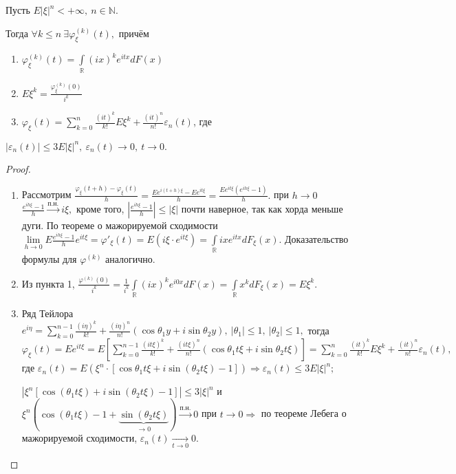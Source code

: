 	\begin{property}
	\begin{theorem}[о производных х.ф.]
		Пусть $E|\xi|^n < + \infty, ~n \in \mathbb{N}.$ 
		
		Тогда $\forall k \leqslant n~ \exists \varphi_\xi^{(k)}(t),$ причём
		\begin{enumerate}
			\item $\varphi_\xi^{(k)}(t) = \int\limits_\mathbb{R}(ix)^ke^{itx}dF(x)$
			\item $E\xi^k = \frac{\varphi_\xi^{(k)}(0)}{i^k}$
			\item $\varphi_\xi(t) = \sum\limits_{k = 0}^{n} \frac{(it)^k}{k!}E\xi^k + \frac{(it)^n}{n!}\varepsilon_n(t)$, где
		\end{enumerate}
		$|\varepsilon_n(t)| \leqslant 3E|\xi|^n, ~\varepsilon_n(t) \to 0, ~ t \to 0.$
	\end{theorem}
	\begin{proof}
		\begin{enumerate}
			\item Рассмотрим $\frac{\varphi_\xi(t + h) - \varphi_\xi(t)}{h} = \frac{Ee^{i(t + h)\xi} - Ee^{it\xi}}{h} = \frac{Ee^{it\xi}(e^{ih\xi} - 1)}{h}.$ при $h \to 0$ $\frac{e^{ih\xi} - 1}{h} \overset{\text{п.н.}}{\longrightarrow}i\xi,$ кроме того, $\left|\frac{e^{ih\xi} - 1}{h}\right| \leqslant |\xi|$ почти наверное, так как хорда меньше дуги. По теореме о мажорируемой сходимости
			$\lim\limits_{h \to 0}E \frac{e^{ih\xi} - 1}{h}e^{it\xi} = \varphi'_\xi(t) = E(i\xi\cdot e^{it\xi}) = \int\limits_\mathbb{R} ixe^{itx}dF_\xi(x).$ Доказательство формулы для $\varphi^{(k)}$ аналогично.
			\item Из пункта 1, $\frac{\varphi^{(k)}(0)}{i^k} = \frac{1}{i^k} \int\limits_\mathbb{R}(ix)^ke^{i0x}dF(x) = \int\limits_\mathbb{R}x^k dF_\xi(x) = E\xi^k.$
			\item Ряд Тейлора $e^{i\eta} = \sum\limits_{k = 0}^{n - 1} \frac{(i\eta)^k}{k!} + \frac{(i\eta)^n}{n!}(\cos\theta_1y + i\sin\theta_2 y), ~|\theta_1| \leqslant 1, ~ |\theta_2| \leqslant 1,$ тогда
			$\varphi_\xi(t) = Ee^{it\xi} = E\left[\sum\limits_{k = 0}^{n - 1} \frac{(it\xi)^k}{k!} + \frac{(it\xi)^n}{n!}(\cos\theta_1 t\xi + i\sin \theta_2 t\xi)\right] = \sum\limits_{k = 0}^{n}\frac{(it)^k}{k!}E\xi^k + \frac{(it)^n}{n!}\varepsilon_n(t), $ где $\varepsilon_n(t) = E(\xi^n\cdot [\cos\theta_1t\xi + i\sin(\theta_2 t\xi) - 1]) \Rightarrow \varepsilon_n(t) \leqslant 3E|\xi|^n;$

			$|\xi^n[\cos(\theta_1t\xi) + i\sin(\theta_2t\xi) - 1]| \leqslant3|\xi|^n$ и $\xi^n(\cos(\theta_1t\xi) - 1 + \underbrace{\sin(\theta_2 t\xi)}_{\to 0}) \overset{\text{п.н.}}{\longrightarrow} 0$ при $t \to 0 \Rightarrow$ по теореме Лебега о мажорируемой сходимости, $\varepsilon_n(t) \underset{t \to 0}{\longrightarrow} 0.$
		\end{enumerate}
	\end{proof}
	\end{property}
